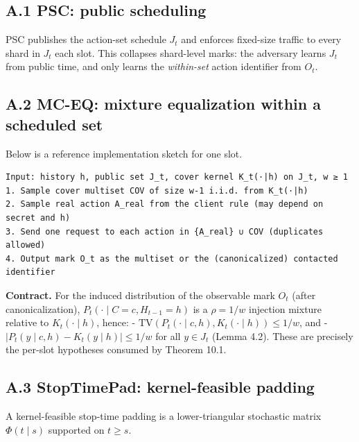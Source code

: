 \documentclass[11pt]{article}
\begin{document}
\hypertarget{a.1-psc-public-scheduling}{%
\subsection{A.1 PSC: public
scheduling}\label{a.1-psc-public-scheduling}}

PSC publishes the action-set schedule \(J_t\) and enforces fixed-size
traffic to every shard in \(J_t\) each slot. This collapses shard-level
marks: the adversary learns \(J_t\) from public time, and only learns
the \emph{within-set} action identifier from \(O_t\).

\hypertarget{a.2-mc-eq-mixture-equalization-within-a-scheduled-set}{%
\subsection{A.2 MC-EQ: mixture equalization within a scheduled
set}\label{a.2-mc-eq-mixture-equalization-within-a-scheduled-set}}

Below is a reference implementation sketch for one slot.

\begin{verbatim}
Input: history h, public set J_t, cover kernel K_t(·|h) on J_t, w ≥ 1
1. Sample cover multiset COV of size w-1 i.i.d. from K_t(·|h)
2. Sample real action A_real from the client rule (may depend on secret and h)
3. Send one request to each action in {A_real} ∪ COV (duplicates allowed)
4. Output mark O_t as the multiset or the (canonicalized) contacted identifier
\end{verbatim}

\textbf{Contract.} For the induced distribution of the observable mark
\(O_t\) (after canonicalization), \(P_t(\cdot\mid C=c,H_{t-1}=h)\) is a
\(\rho=1/w\) injection mixture relative to \(K_t(\cdot\mid h)\), hence:
- \(\mathrm{TV}(P_t(\cdot\mid c,h), K_t(\cdot\mid h)) \le 1/w\), and -
\(|P_t(y\mid c,h)-K_t(y\mid h)|\le 1/w\) for all \(y\in J_t\) (Lemma
4.2). These are precisely the per-slot hypotheses consumed by Theorem
10.1.

\hypertarget{a.3-stoptimepad-kernel-feasible-padding}{%
\subsection{A.3 StopTimePad: kernel-feasible
padding}\label{a.3-stoptimepad-kernel-feasible-padding}}

A kernel-feasible stop-time padding is a lower-triangular stochastic
matrix \(\Phi(t\mid s)\) supported on \(t\ge s\).
\end{document}
